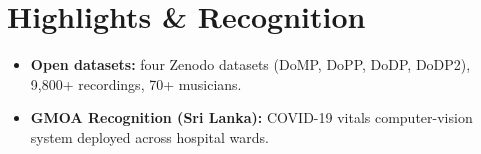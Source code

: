 \documentclass[11pt]{article}
\begin{document}
\section*{Highlights \& Recognition}
\begin{itemize}[leftmargin=1.2em, itemsep=-0.25em]
    \item \textbf{Open datasets:} four Zenodo datasets (DoMP, DoPP, DoDP, DoDP2), 9,800+ recordings, 70+ musicians.
    \item \textbf{GMOA Recognition (Sri Lanka):} COVID-19 vitals computer-vision system deployed across hospital wards.
\end{itemize}
\end{document}
